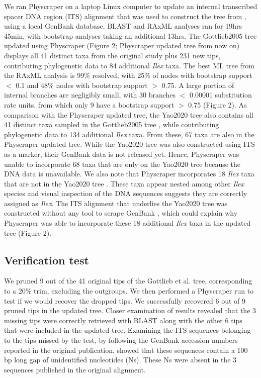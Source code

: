 \documentclass{bmcart}
\begin{document}
We ran Physcraper on a laptop Linux computer to update an internal transcribed
spacer DNA region (ITS) alignment that was used to construct the tree from \cite{gottlieb2005molecular},
using a local GenBank database.  BLAST and RAxML analyses ran for 19hrs 45min, with bootstrap
analyses taking an additional 13hrs.
The Gottlieb2005 tree \cite{gottlieb2005molecular} updated using Physcraper (Figure 2;
Physcraper updated tree from now on) displays all 41 distinct
taxa from the original study plus 231 new tips, contributing phylogenetic data to
84 additional \textit{Ilex} taxa. The best ML tree from the RAxML analysis is 99\%
resolved, with 25\% of nodes with bootstrap support $<$ 0.1 and 48\% nodes with
bootstrap support $>$ 0.75.
A large portion of internal branches are negligibly small, with 30 branches
$<$ 0.00001 substitution rate units, from which only 9 have a bootstrap support $>$ 0.75
(Figure 2).
As comparison with the Physcraper updated tree, the Yao2020 tree \cite{yao2020phylogeny}
also contains all 41 distinct taxa
sampled in the Gottlieb2005 tree \cite{gottlieb2005molecular},
while contributing phylogenetic data to 134 additional \textit{Ilex} taxa. From these,
67 taxa are also in the Physcraper updated tree.
While the Yao2020 tree \cite{yao2020phylogeny} was also constructed using
ITS as a marker, their GenBank data is not released yet. Hence, Physcraper was unable
to incorporate 68 taxa that are only on the Yao2020 tree because the DNA data is unavailable.
We also note that Physcraper incorporates 18 \textit{Ilex} taxa that are not in the Yao2020
tree \cite{yao2020phylogeny}. These taxa appear nested among other \textit{Ilex} species
and visual inspection of the DNA sequences suggests they are correctly assigned as \textit{Ilex}.
The ITS alignment that underlies the Yao2020 tree was constructed without any tool to
scrape GenBank \cite{yao2020phylogeny}, which could explain why Physcraper was able to
incorporate these 18 additional \textit{Ilex} taxa in the updated tree (Figure 2).


\subsection*{Verification test}

We pruned 9 out of the 41 original tips of the Gottlieb et al. tree, corresponding
to a 20\% trim, excluding the outgroups. We then performed a Physcraper run to test
if we would recover the dropped tips.
We successfully recovered 6 out of 9 pruned tips in the updated tree.
Closer examination of results revealed that the 3 missing tips were correctly retrieved
with BLAST along with the other 6 tips that were included in the updated tree. Examining
the ITS sequences belonging to the tips missed by the test, by following the GenBank
accession numbers reported in the original publication, showed that these sequences
contain a 100 bp long gap of unidentified nucleotides (Ns). These Ns were absent
in the 3 sequences published in the original alignment.
\end{document}
